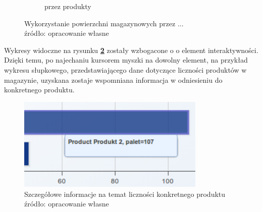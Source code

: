 \begin{figure}[H]
\begin{subfigure}[b]{0.75\textwidth}
                \caption{przez produkty}
			\label{c7:fig:app:stat_product_bar}
       		\end{subfigure}
       		\caption[Aplikacja - Statystyki wykorzystania powierzchni]{
       			Wykorzystanie powierzchni magazynowych przez ...\\
				źródło: opracowanie własne
			}
			\label{c7:fig:app:stat_charts}
		\end{figure} 		
		Wykresy widoczne na rysunku \textbf{\ref{c7:fig:app:stat_charts}} zostały wzbogacone o
		o element interaktywności. Dzięki temu, po najechaniu kursorem myszki na dowolny element, na 
		przykład wykresu słupkowego, przedstawiającego dane dotyczące liczności produktów w magazynie, 
		uzyskana zostaje wspomniana informacja w odniesieniu do konkretnego produktu. 
		\begin{figure}[H]
			\centering
			\includegraphics[width=0.8\textwidth]{images/app/stat_bar_detail}
			\caption[Aplikacja - Szczegółowe informacje z wykresu]{
				Szczegółowe informacje na temat liczności konkretnego produktu\\
				źródło: opracowanie własne
			}
			\label{c7:fig:app:stat_product_bar_detail}
		\end{figure}